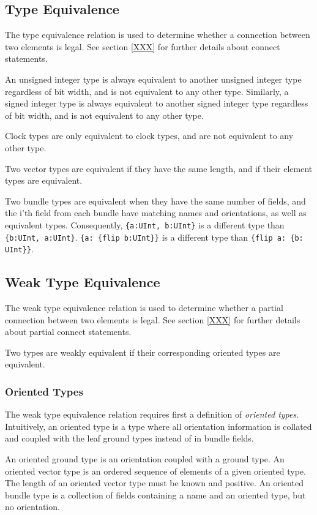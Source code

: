 \documentclass[12pt]{article}
\begin{document}
\subsection{Type Equivalence}

The type equivalence relation is used to determine whether a connection between two elements is legal. See section \ref{XXX} for further details about connect statements.

An unsigned integer type is always equivalent to another unsigned integer type regardless of bit width, and is not equivalent to any other type. Similarly, a signed integer type is always equivalent to another signed integer type regardless of bit width, and is not equivalent to any other type. 

Clock types are only equivalent to clock types, and are not equivalent to any other type.

Two vector types are equivalent if they have the same length, and if their element types are equivalent.

Two bundle types are equivalent when they have the same number of fields, and the i'th field from each bundle have matching names and orientations, as well as equivalent types. Consequently, \verb|{a:UInt, b:UInt}| is a different type than \verb|{b:UInt, a:UInt}|. \verb|{a: {flip b:UInt}}| is a different type than \verb|{flip a: {b: UInt}}|.

\subsection{Weak Type Equivalence}

The weak type equivalence relation is used to determine whether a partial connection between two elements is legal. See section \ref{XXX} for further details about partial connect statements.

Two types are weakly equivalent if their corresponding oriented types are equivalent.

\subsubsection{Oriented Types}
The weak type equivalence relation requires first a definition of {\em oriented types}. Intuitively, an oriented type is a type where all orientation information is collated and coupled with the leaf ground types instead of in bundle fields.

An oriented ground type is an orientation coupled with a ground type. An oriented vector type is an ordered sequence of elements of a given oriented type. The length of an oriented vector type must be known and positive. An oriented bundle type is a collection of fields containing a name and an oriented type, but no orientation.
\end{document}
